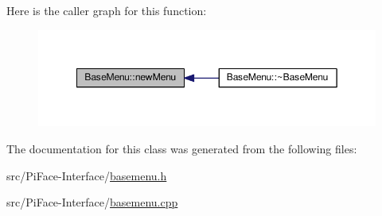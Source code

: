 Here is the caller graph for this function\+:\nopagebreak
\begin{figure}[H]
\begin{center}
\leavevmode
\includegraphics[width=349pt]{classBaseMenu_a722bb88987e9a64015c59f3419d89704_icgraph}
\end{center}
\end{figure}




The documentation for this class was generated from the following files\+:\begin{DoxyCompactItemize}
\item 
src/\+Pi\+Face-\/\+Interface/\hyperlink{basemenu_8h}{basemenu.\+h}\item 
src/\+Pi\+Face-\/\+Interface/\hyperlink{basemenu_8cpp}{basemenu.\+cpp}\end{DoxyCompactItemize}
